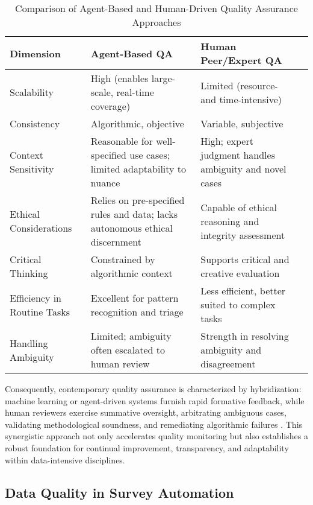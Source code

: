 \documentclass[sigconf]{acmart}
\begin{document}
\begin{table*}[htbp]
\centering
\caption{Comparison of Agent-Based and Human-Driven Quality Assurance Approaches}
\label{tab:qa_comparison}
\begin{adjustbox}{max width=\textwidth}
\begin{tabular}{@{}llll@{}}
\toprule
Dimension & Agent-Based QA & Human Peer/Expert QA &  \\
\midrule
Scalability & High (enables large-scale, real-time coverage) & Limited (resource- and time-intensive) &  \\
Consistency & Algorithmic, objective & Variable, subjective &  \\
Context Sensitivity & Reasonable for well-specified use cases; limited adaptability to nuance & High; expert judgment handles ambiguity and novel cases &  \\
Ethical Considerations & Relies on pre-specified rules and data; lacks autonomous ethical discernment & Capable of ethical reasoning and integrity assessment &  \\
Critical Thinking & Constrained by algorithmic context & Supports critical and creative evaluation &  \\
Efficiency in Routine Tasks & Excellent for pattern recognition and triage & Less efficient, better suited to complex tasks &  \\
Handling Ambiguity & Limited; ambiguity often escalated to human review & Strength in resolving ambiguity and disagreement &  \\
\bottomrule
\end{tabular}
\end{adjustbox}
\end{table*}

Consequently, contemporary quality assurance is characterized by hybridization: machine learning or agent-driven systems furnish rapid formative feedback, while human reviewers exercise summative oversight, arbitrating ambiguous cases, validating methodological soundness, and remediating algorithmic failures \cite{ref88}\cite{ref89}\cite{ref91}\cite{ref92}\cite{ref96}\cite{ref98}\cite{ref108}. This synergistic approach not only accelerates quality monitoring but also establishes a robust foundation for continual improvement, transparency, and adaptability within data-intensive disciplines.

\subsection{Data Quality in Survey Automation}
\end{document}
